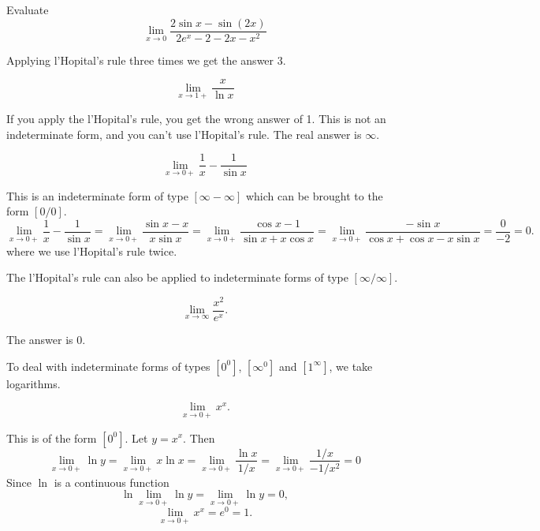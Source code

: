 \documentclass[../calc1-main.tex]{subfiles}
\begin{document}
\begin{example}
  Evaluate
  \[
    \lim_{x \to 0} \frac{2\sin x-\sin(2x)}{2e^x-2-2x-x^2}
  \]
\end{example}
\begin{solution}
  Applying l'Hopital's rule three times we get the answer $3$.
\end{solution}

\begin{example}
  \[
    \lim_{x \to 1+} \frac{x}{\ln x}
  \]
\end{example}
\begin{solution}
  If you apply the l'Hopital's rule, you get the wrong answer of 1. This is not an indeterminate form, and you can't use l'Hopital's rule. The real answer is $\infty$.
\end{solution}

\begin{example}
  \[
    \lim_{x \to 0+} \frac{1}{x} - \frac{1}{\sin x}
  \]
\end{example}
\begin{solution}
  This is an indeterminate form of type $[ \infty - \infty]$ which can be brought to the form $[0/0]$.
  \[
    \lim_{x \to 0+} \frac{1}{x} - \frac{1}{\sin x} =
    \lim_{x \to 0+} \frac{\sin x - x}{x \sin x} =
    \lim_{x \to 0+} \frac{\cos x - 1}{\sin x + x \cos x} =
    \lim_{x \to 0+} \frac{-\sin x}{\cos x + \cos x - x \sin x} = \frac{0}{-2} =0.
  \]
  where we use l'Hopital's rule twice.
\end{solution}

The l'Hopital's rule can also be applied to indeterminate forms of type $[\infty/\infty]$.

\begin{example}
  \[
    \lim_{x \to \infty} \frac{x^2}{e^x}.
  \]
\end{example}
\begin{solution}
  The answer is 0.
\end{solution}

To deal with indeterminate forms of types $[0^0]$, $[\infty^0]$ and $[1^{\infty}]$, we take logarithms.

\begin{example}
  \[
    \lim_{x \to 0+} x^x.
  \]
\end{example}
\begin{solution}
  This is of the form $[0^0]$. Let $y= x^x$. Then
  \[
    \lim_{x \to 0+} \ln y = \lim_{x \to 0+} x \ln x = \lim_{x \to 0+} \frac{\ln x}{1/x}
    = \lim_{x \to 0+} \frac{1/x}{-1/x^2} = 0
  \]
  Since $\ln$ is a continuous function
  \[
    \ln \lim_{x \to 0+} \ln y = \lim_{x \to 0+} \ln y = 0,
  \]
  \[
    \lim_{x \to 0+} x^x = e^0 = 1.
  \]
\end{solution}
\end{document}
